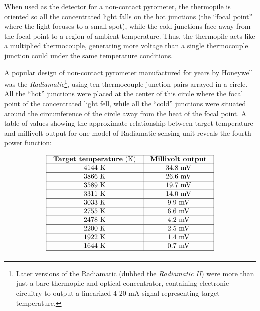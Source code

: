 When used as the detector for a non-contact pyrometer, the thermopile is oriented so all the concentrated light falls on the hot junctions (the ``focal point'' where the light focuses to a small spot), while the cold junctions face away from the focal point to a region of ambient temperature.  Thus, the thermopile acts like a multiplied thermocouple, generating more voltage than a single thermocouple junction could under the same temperature conditions.  

\filbreak

A popular design of non-contact pyrometer manufactured for years by Honeywell was the \textit{Radiamatic}\footnote{Later versions of the Radiamatic (dubbed the \textit{Radiamatic II}) were more than just a bare thermopile and optical concentrator, containing electronic circuitry to output a linearized 4-20 mA signal representing target temperature.}, using ten thermocouple junction pairs arrayed in a circle.  All the ``hot'' junctions were placed at the center of this circle where the focal point of the concentrated light fell, while all the ``cold'' junctions were situated around the circumference of the circle away from the heat of the focal point.  A table of values showing the approximate relationship between target temperature and millivolt output for one model of Radiamatic sensing unit reveals the fourth-power function:   


$$\vbox{\offinterlineskip
\halign{\strut
\vrule \quad\hfil # \ \hfil & 
\vrule \quad\hfil # \ \hfil \vrule \cr
\noalign{\hrule}
%
\textbf{Target temperature} (K) & \textbf{Millivolt output} \cr
%
\noalign{\hrule}
%
4144 K & 34.8 mV \cr
%
\noalign{\hrule}
%
3866 K & 26.6 mV \cr
%
\noalign{\hrule}
%
3589 K & 19.7 mV \cr
%
\noalign{\hrule}
%
3311 K & 14.0 mV \cr
%
\noalign{\hrule}
%
3033 K & 9.9 mV \cr
%
\noalign{\hrule}
%
2755 K & 6.6 mV \cr
%
\noalign{\hrule}
%
2478 K & 4.2 mV \cr
%
\noalign{\hrule}
%
2200 K & 2.5 mV \cr
%
\noalign{\hrule}
%
1922 K & 1.4 mV \cr
%
\noalign{\hrule}
%
1644 K & 0.7 mV \cr
%
\noalign{\hrule}
} %
}$$ %

